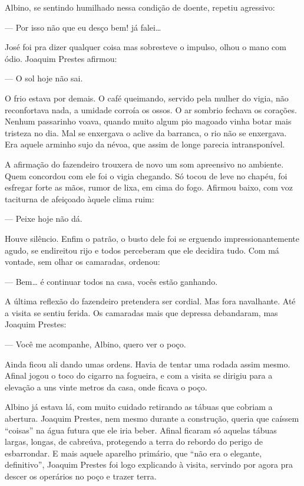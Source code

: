 \begin{linenumbers}
Albino, se sentindo humilhado nessa condição de doente, repetiu
agressivo:

--- Por isso não que eu desço bem! já falei\ldots{}

José foi pra dizer qualquer coisa mas sobresteve o impulso, olhou o mano
com ódio. Joaquim Prestes afirmou:

--- O sol hoje não sai.

O frio estava por demais. O café queimando, servido pela mulher do
vigia, não reconfortava nada, a umidade corroía os ossos. O ar sombrio
fechava os corações. Nenhum passarinho voava, quando muito algum pio
magoado vinha botar mais tristeza no dia. Mal se enxergava o aclive da
barranca, o rio não se enxergava. Era aquele arminho sujo da névoa, que
assim de longe parecia intransponível.

A afirmação do fazendeiro trouxera de novo um som apreensivo no
ambiente. Quem concordou com ele foi o vigia chegando. Só tocou de leve
no chapéu, foi esfregar forte as mãos, rumor de lixa, em cima do fogo.
Afirmou baixo, com voz taciturna de afeiçoado àquele clima ruim:

--- Peixe hoje não dá.

Houve silêncio. Enfim o patrão, o busto dele foi se erguendo
impressionantemente agudo, se endireitou rijo e todos perceberam que ele
decidira tudo. Com má vontade, sem olhar os camaradas, ordenou:

--- Bem\ldots{} é continuar todos na casa, vocês estão ganhando.

A última reflexão do fazendeiro pretendera ser cordial. Mas fora
navalhante. Até a visita se sentiu ferida. Os camaradas mais que
depressa debandaram, mas Joaquim Prestes:

--- Você me acompanhe, Albino, quero ver o poço.

Ainda ficou ali dando umas ordens. Havia de tentar uma rodada assim
mesmo. Afinal jogou o toco do cigarro na fogueira, e com a visita se
dirigiu para a elevação a uns vinte metros da casa, onde ficava o poço.

Albino já estava lá, com muito cuidado retirando as tábuas que cobriam a
abertura. Joaquim Prestes, nem mesmo durante a construção, queria que
caíssem ``coisas'' na água futura que ele iria beber. Afinal ficaram só
aquelas tábuas largas, longas, de cabreúva, protegendo a terra do
rebordo do perigo de esbarrondar. E mais aquele aparelho primário, que
``não era o elegante, definitivo'', Joaquim Prestes foi logo explicando
à visita, servindo por agora pra descer os operários no poço e trazer
terra.


\end{linenumbers}
